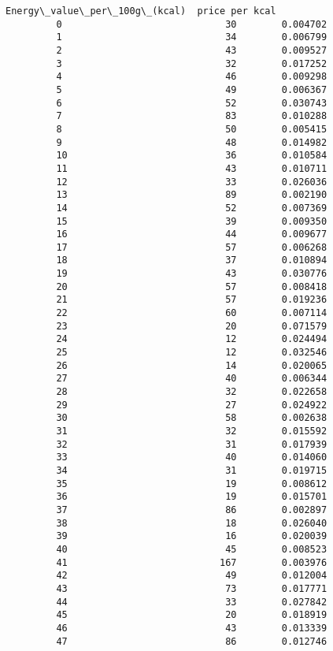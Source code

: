 \documentclass[11pt]{article}
\begin{document}
\begin{Verbatim}[commandchars=\\\{\}]
             Energy\_value\_per\_100g\_(kcal)  price per kcal  
         0                             30        0.004702  
         1                             34        0.006799  
         2                             43        0.009527  
         3                             32        0.017252  
         4                             46        0.009298  
         5                             49        0.006367  
         6                             52        0.030743  
         7                             83        0.010288  
         8                             50        0.005415  
         9                             48        0.014982  
         10                            36        0.010584  
         11                            43        0.010711  
         12                            33        0.026036  
         13                            89        0.002190  
         14                            52        0.007369  
         15                            39        0.009350  
         16                            44        0.009677  
         17                            57        0.006268  
         18                            37        0.010894  
         19                            43        0.030776  
         20                            57        0.008418  
         21                            57        0.019236  
         22                            60        0.007114  
         23                            20        0.071579  
         24                            12        0.024494  
         25                            12        0.032546  
         26                            14        0.020065  
         27                            40        0.006344  
         28                            32        0.022658  
         29                            27        0.024922  
         30                            58        0.002638  
         31                            32        0.015592  
         32                            31        0.017939  
         33                            40        0.014060  
         34                            31        0.019715  
         35                            19        0.008612  
         36                            19        0.015701  
         37                            86        0.002897  
         38                            18        0.026040  
         39                            16        0.020039  
         40                            45        0.008523  
         41                           167        0.003976  
         42                            49        0.012004  
         43                            73        0.017771  
         44                            33        0.027842  
         45                            20        0.018919  
         46                            43        0.013339  
         47                            86        0.012746  
\end{Verbatim}
            
\end{document}
